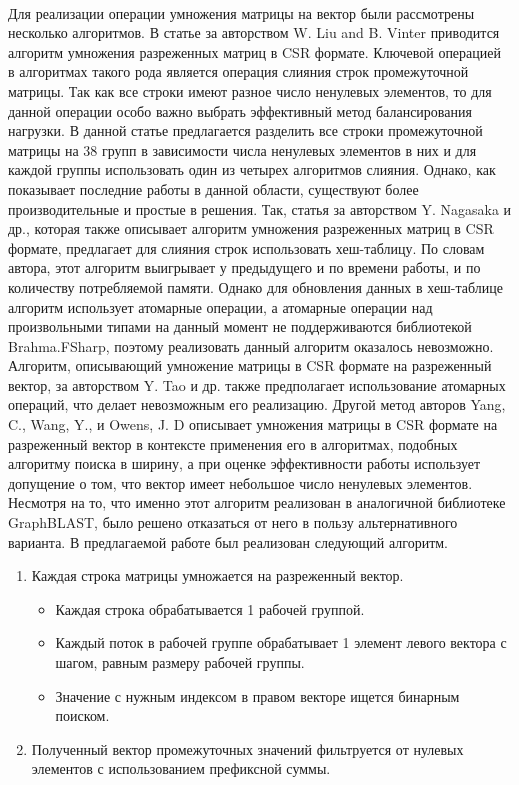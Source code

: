 \paragraph{}
Для реализации операции умножения матрицы на вектор были рассмотрены несколько алгоритмов. В статье за авторством W. Liu and B. Vinter\cite{esc} приводится алгоритм умножения разреженных матриц в CSR формате. Ключевой операцией в алгоритмах такого рода является операция слияния строк промежуточной матрицы. Так как все строки имеют разное число ненулевых элементов, то для данной операции особо важно выбрать эффективный метод балансирования нагрузки. В данной статье предлагается разделить все строки промежуточной матрицы на 38 групп в зависимости числа ненулевых элементов в них и для каждой группы использовать один из четырех алгоритмов слияния. Однако, как показывает последние работы в данной области\cite{hash}, существуют более производительные и простые в решения. Так, статья за авторством Y. Nagasaka и др.\cite{hash}, которая также описывает алгоритм умножения разреженных матриц в CSR формате, предлагает для слияния строк использовать хеш-таблицу. По словам автора, этот алгоритм выигрывает у предыдущего и по времени работы, и по количеству потребляемой памяти. Однако для обновления данных в хеш-таблице алгоритм использует атомарные операции, а атомарные операции над произвольными типами на данный момент не поддерживаются библиотекой Brahma.FSharp, поэтому реализовать данный алгоритм оказалось невозможно. Алгоритм, описывающий умножение матрицы в CSR формате на разреженный вектор, за авторством Y. Tao и др.\cite{atomic} также предполагает использование атомарных операций, что делает невозможным его реализацию. Другой метод авторов Yang, C., Wang, Y., и Owens, J. D\cite{mxv_bfs} описывает умножения матрицы в CSR формате на разреженный вектор в контексте применения его в алгоритмах, подобных алгоритму поиска в ширину, а при оценке эффективности работы использует допущение о том, что вектор имеет небольшое число ненулевых элементов. Несмотря на то, что именно этот алгоритм реализован в аналогичной библиотеке GraphBLAST, было решено отказаться от него в пользу альтернативного варианта. В предлагаемой работе был реализован следующий алгоритм.
\begin{enumerate}
    \item Каждая строка матрицы умножается на разреженный вектор.
    \begin{itemize}
        \item Каждая строка обрабатывается 1 рабочей группой.
        \item Каждый поток в рабочей группе обрабатывает 1 элемент левого вектора с шагом, равным размеру рабочей группы.
        \item Значение с нужным индексом в правом векторе ищется бинарным поиском.
    \end{itemize}
    \item Полученный вектор промежуточных значений фильтруется от нулевых элементов с использованием префиксной суммы.
\end{enumerate}

